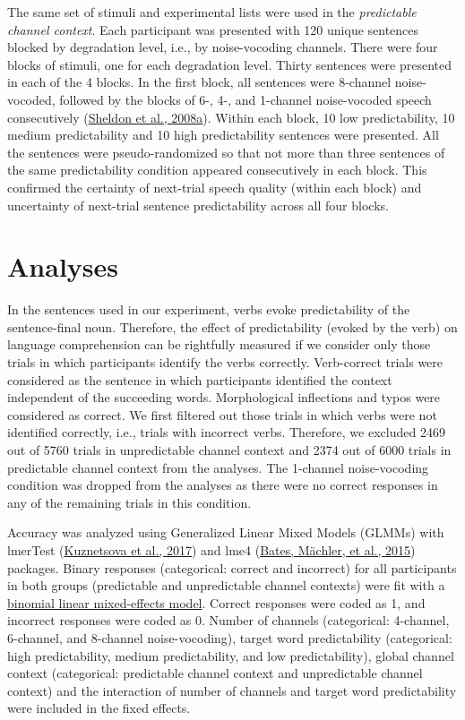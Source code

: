 \documentclass[a4paper, nobind]{templates/ociamthesis}
\begin{document}
The same set of stimuli and experimental lists were used in the \emph{predictable channel context}.
Each participant was presented with 120 unique sentences blocked by degradation level, i.e., by noise-vocoding channels.
There were four blocks of stimuli, one for each degradation level.
Thirty sentences were presented in each of the 4 blocks.
In the first block, all sentences were 8-channel noise-vocoded, followed by the blocks of 6-, 4-, and 1-channel noise-vocoded speech consecutively (\protect\hyperlink{ref-Sheldon2008a}{Sheldon et al., 2008a}).
Within each block, 10 low predictability, 10 medium predictability and 10 high predictability sentences were presented.
All the sentences were pseudo-randomized so that not more than three sentences of the same predictability condition appeared consecutively in each block.
This confirmed the certainty of next-trial speech quality (within each block) and uncertainty of next-trial sentence predictability across all four blocks.

\hypertarget{analyses-2}{%
\section{Analyses}\label{analyses-2}}

In the sentences used in our experiment, verbs evoke predictability of the sentence-final noun.
Therefore, the effect of predictability (evoked by the verb) on language comprehension can be rightfully measured if we consider only those trials in which participants identify the verbs correctly.
Verb-correct trials were considered as the sentence in which participants identified the context independent of the succeeding words.
Morphological inflections and typos were considered as correct.
We first filtered out those trials in which verbs were not identified correctly, i.e., trials with incorrect verbs.
Therefore, we excluded 2469 out of 5760 trials in unpredictable channel context and 2374 out of 6000 trials in predictable channel context from the analyses.
The 1-channel noise-vocoding condition was dropped from the analyses as there were no correct responses in any of the remaining trials in this condition.

Accuracy was analyzed using Generalized Linear Mixed Models (GLMMs) with lmerTest (\protect\hyperlink{ref-Kuznetsova2017}{Kuznetsova et al., 2017}) and lme4 (\protect\hyperlink{ref-Bates2015}{Bates, Mächler, et al., 2015}) packages.
Binary responses (categorical: correct and incorrect) for all participants in both groups (predictable and unpredictable channel contexts) were fit with a \protect\hyperlink{binomial-logistic-mixed-effects-model}{binomial linear mixed-effects model}.
Correct responses were coded as 1, and incorrect responses were coded as 0.
Number of channels (categorical: 4-channel, 6-channel, and 8-channel noise-vocoding), target word predictability (categorical: high predictability, medium predictability, and low predictability), global channel context (categorical: predictable channel context and unpredictable channel context) and the interaction of number of channels and target word predictability were included in the fixed effects.
\end{document}
